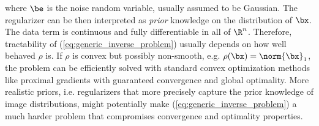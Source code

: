 \documentclass[11pt]{article}
\begin{document}
where $\be$ is the noise random variable, usually assumed to be Gaussian. The regularizer can be then interpreted as \textit{prior} knowledge on the distribution of $\bx$. The data term is continuous and fully differentiable in all of $\R^n$. Therefore, tractability of (\ref{eq:generic_inverse_problem}) usually depends on how well behaved $\rho$ is. If $\rho$ is convex but possibly non-smooth, e.g. $\rho(\bx)=\norm{\bx}_1$, the problem can be efficiently solved with standard convex optimization methods like proximal gradients with guaranteed convergence and global optimality.\cite{beckFastIterativeShrinkageThresholding2009} More realistic priors, i.e. regularizers that more precisely capture the prior knowledge of image distributions, might potentially make (\ref{eq:generic_inverse_problem}) a much harder problem that compromises convergence and optimality properties.\cite{ulyanovDeepImagePrior2017}
\end{document}
